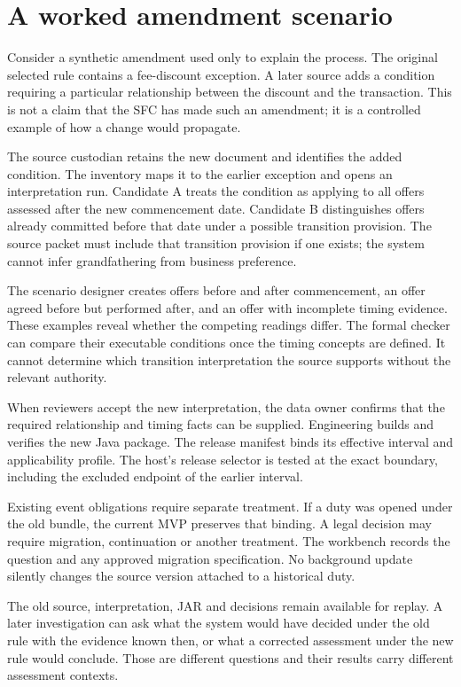 \documentclass[12pt,a4paper,oneside,openany]{book}
\begin{document}
\section{A worked amendment scenario}
\label{merge:M10:05}


Consider a synthetic amendment used only to explain the process. The original
selected rule contains a fee-discount exception. A later source adds a condition
requiring a particular relationship between the discount and the transaction.
This is not a claim that the SFC has made such an amendment; it is a controlled
example of how a change would propagate.

The source custodian retains the new document and identifies the added condition.
The inventory maps it to the earlier exception and opens an interpretation run.
Candidate A treats the condition as applying to all offers assessed after the
new commencement date. Candidate B distinguishes offers already committed before
that date under a possible transition provision. The source packet must include
that transition provision if one exists; the system cannot infer grandfathering
from business preference.

The scenario designer creates offers before and after commencement, an offer
agreed before but performed after, and an offer with incomplete timing evidence.
These examples reveal whether the competing readings differ. The formal checker
can compare their executable conditions once the timing concepts are defined.
It cannot determine which transition interpretation the source supports without
the relevant authority.

When reviewers accept the new interpretation, the data owner confirms that the
required relationship and timing facts can be supplied. Engineering builds and
verifies the new Java package. The release manifest binds its effective interval
and applicability profile. The host's release selector is tested at the exact
boundary, including the excluded endpoint of the earlier interval.

Existing event obligations require separate treatment. If a duty was opened under
the old bundle, the current MVP preserves that binding. A legal decision may
require migration, continuation or another treatment. The workbench records the
question and any approved migration specification. No background update silently
changes the source version attached to a historical duty.

The old source, interpretation, JAR and decisions remain available for replay.
A later investigation can ask what the system would have decided under the old
rule with the evidence known then, or what a corrected assessment under the new
rule would conclude. Those are different questions and their results carry
different assessment contexts.
\end{document}
